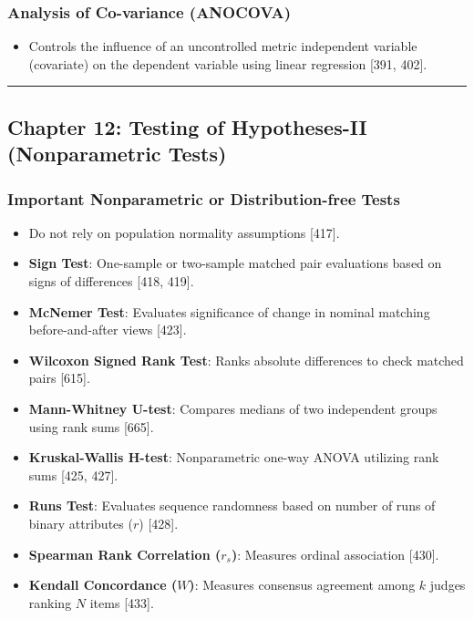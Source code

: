 \documentclass[
]{article}
\providecommand{\tightlist}{%
  \setlength{\itemsep}{0pt}\setlength{\parskip}{0pt}}
\begin{document}
\subsubsection{Analysis of Co-variance
(ANOCOVA)}\label{analysis-of-co-variance-anocova}

\begin{itemize}
\tightlist
\item
  Controls the influence of an uncontrolled metric independent variable
  (covariate) on the dependent variable using linear regression {[}391,
  402{]}.
\end{itemize}

\begin{center}\rule{0.5\linewidth}{0.5pt}\end{center}

\subsection{Chapter 12: Testing of Hypotheses-II (Nonparametric
Tests)}\label{chapter-12-testing-of-hypotheses-ii-nonparametric-tests}

\subsubsection{Important Nonparametric or Distribution-free
Tests}\label{important-nonparametric-or-distribution-free-tests}

\begin{itemize}
\tightlist
\item
  Do not rely on population normality assumptions {[}417{]}.
\item
  \textbf{Sign Test}: One-sample or two-sample matched pair evaluations
  based on signs of differences {[}418, 419{]}.
\item
  \textbf{McNemer Test}: Evaluates significance of change in nominal
  matching before-and-after views {[}423{]}.
\item
  \textbf{Wilcoxon Signed Rank Test}: Ranks absolute differences to
  check matched pairs {[}615{]}.
\item
  \textbf{Mann-Whitney U-test}: Compares medians of two independent
  groups using rank sums {[}665{]}.
\item
  \textbf{Kruskal-Wallis H-test}: Nonparametric one-way ANOVA utilizing
  rank sums {[}425, 427{]}.
\item
  \textbf{Runs Test}: Evaluates sequence randomness based on number of
  runs of binary attributes (\(r\)) {[}428{]}.
\item
  \textbf{Spearman Rank Correlation (\(r_s\))}: Measures ordinal
  association {[}430{]}.
\item
  \textbf{Kendall Concordance (\(W\))}: Measures consensus agreement
  among \(k\) judges ranking \(N\) items {[}433{]}.
\end{itemize}
\end{document}
